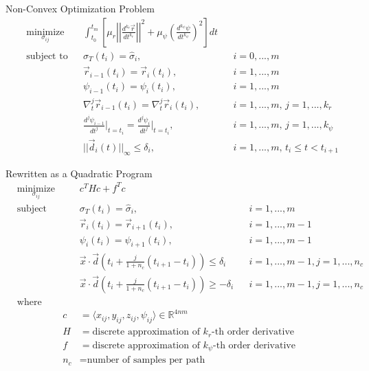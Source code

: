 \documentclass[onlymath]{beamer}
\begin{document}
\begin{frame}{Non-Convex Optimization Problem}
    \begin{align*}
    & \underset{\sigma_{ij}}{\text{minimize}}
        & & \int_{t_0}^{t_m}{ \left[
            \mu_r    \left|\left| \frac{d^{k_r} \vec{r}}{d t^{k_r}} \right|\right|^2
          + \mu_\psi \left( \frac{d^{k_\psi} \psi}{d t^{k_\psi}} \right)^2
        \right] dt} \\
    & \text{subject to}
        & & \sigma_T(t_i) = \hat{\sigma}_i,
        & & i = 0, ..., m \\
    & & & \vec{r}_{i - 1}(t_i) = \vec{r}_i(t_i),
        & & i = 1, ..., m \\
    & & & \psi_{i - 1}(t_i) = \psi_i(t_i),
        & & i = 1, ..., m \\
    & & & \nabla_t^j \vec{r}_{i - 1}(t_i) = \nabla_t^j \vec{r}_i(t_i),
      & & i = 1, ..., m, \, j = 1, ..., k_r \\
    & & & \frac{d^j \psi_{i - 1}}{d t^j} \big|_{t = t_i} = \frac{d^j \psi_i}{d t^j} \big|_{t = t_i},
      & & i = 1, ..., m, \, j = 1, ..., k_\psi \\
    & & & ||\vec{d}_i(t)||_\infty \le \delta_i,
      & & i = 1, ..., m, \, t_i \le t < t_{i + 1}
    \end{align*}
\end{frame}

\begin{frame}{Rewritten as a Quadratic Program}
    \begin{align*}
    & \underset{\sigma_{ij}}{\text{minimize}}
        & & c^T H c + f^T c \\
    & \text{subject to}
        & & \sigma_T(t_i) = \hat{\sigma}_i,
        & & i = 1, ..., m \\
    & & & \vec{r}_i(t_i) = \vec{r}_{i + 1}(t_i),
        & & i = 1, ..., m - 1 \\
    & & & \psi_i(t_i) = \psi_{i + 1}(t_i),
        & & i = 1, ..., m - 1 \\
    & & & \vec{x} \cdot \vec{d}\left(t_i + \frac{j}{1 + n_c}\left(t_{i + 1} - t_i\right)\right)
          \le \delta_i
        & & i = 1, ..., m - 1, j = 1, ..., n_c \\
    & & & \vec{x} \cdot \vec{d}\left(t_i + \frac{j}{1 + n_c}\left(t_{i + 1} - t_i\right)\right)
          \ge -\delta_i
        & & i = 1, ..., m - 1, j = 1, ..., n_c \\
    & \text{where} \\
    & & c   &= \langle x_{ij}, y_{ij}, z_{ij}, \psi_{ij} \rangle \in \mathbb{R}^{4nm} \\
    & & H   &= \text{discrete approximation of $k_r$-th order derivative} \\
    & & f   &= \text{discrete approximation of $k_\psi$-th order derivative} \\
    & & n_c &= \text{number of samples per path segment} \\
    \end{align*}
\end{frame}
\end{document}
